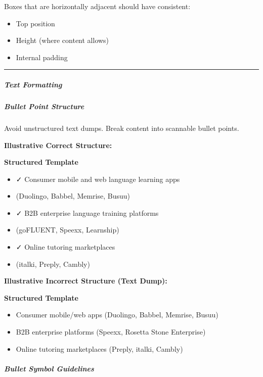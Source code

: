 \documentclass[11pt]{article}
\begin{document}
Boxes that are horizontally adjacent should have consistent:

\begin{itemize}[leftmargin=*,itemsep=2pt,topsep=2pt]
\item {} Top position
\item {} Height (where content allows)
\item {} Internal padding
\end{itemize}

\vspace{0.5em}\hrule\vspace{0.5em}

\subparagraph{Text Formatting}\mbox{}\par

\subparagraph{Bullet Point Structure}\mbox{}\par

Avoid unstructured text dumps. Break content into scannable bullet points.


\textbf{Illustrative Correct Structure:}

\textbf{Structured Template}
\begin{itemize}[leftmargin=*,itemsep=2pt,topsep=2pt]
\item {} ✓ Consumer mobile and web language learning apps
\item {} (Duolingo, Babbel, Memrise, Busuu)
\item {} ✓ B2B enterprise language training platforms
\item {} (goFLUENT, Speexx, Learnship)
\item {} ✓ Online tutoring marketplaces
\item {} (italki, Preply, Cambly)
\end{itemize}

\textbf{Illustrative Incorrect Structure (Text Dump):}

\textbf{Structured Template}
\begin{itemize}[leftmargin=*,itemsep=2pt,topsep=2pt]
\item {} Consumer mobile/web apps (Duolingo, Babbel, Memrise, Busuu)
\item {} B2B enterprise platforms (Speexx, Rosetta Stone Enterprise)
\item {} Online tutoring marketplaces (Preply, italki, Cambly)
\end{itemize}

\subparagraph{Bullet Symbol Guidelines}\mbox{}\par
\end{document}
